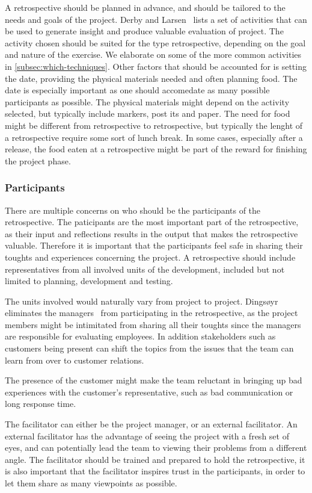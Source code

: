 \documentclass[12pt]{article}
\begin{document}
A retrospective should be planned in advance, and should be tailored to the needs and goals of the project. Derby and Larsen~\cite{Derby2007} lists a set of activities that can be used to generate insight and produce valuable evaluation of project. The activity chosen should be suited for the type retrospective, depending on the goal and nature of the exercise. We elaborate on some of the more common activities in \autoref{subsec:which-techniques}. Other factors that should be accounted for is setting the date, providing the physical materials needed and often planning food. The date is especially important as one should accomedate as many possible participants as possible. The physical materials might depend on the activity selected, but typically include markers, post its and paper. The need for food might be different from retrospective to retrospective, but typically the lenght of a retrospective require some sort of lunch break. In some cases, especially after a release, the food eaten at a retrospective might be part of the reward for finishing the project phase.


\subsubsection{Participants}
There are multiple concerns on who should be the participants of the retrospective.  The paticipants are the most important part of the retrospective, as their input and reflections results in the output that makes the retrospective valuable. Therefore it is important that the participants feel safe in sharing their toughts and experiences concerning the project. A retrospective should include representatives from all involved units of the development, included but not limited to planning, development and testing. 

The units involved would naturally vary from project to project. Dingsøyr eliminates the managers~\cite{Dingsoyr2005} from participating in the retrospective, as the project members might be intimitated from sharing all their toughts since the managers are responsible for evaluating employees. In addition stakeholders such as customers being present can shift the topics from the issues that the team can learn from over to customer relations. 

The presence of the customer might make the team reluctant in bringing up bad experiences with the customer's representative, such as bad communication or long response time. 

The facilitator can either be the project manager, or an external facilitator. An external facilitator has the advantage of seeing the project with a fresh set of eyes, and can potentially lead the team to viewing their problems from a different angle. The facilitator should be trained and prepared to hold the retrospective, it is also important that the facilitator inspires trust in the participants, in order to let them share as many viewpoints as possible.
\end{document}
